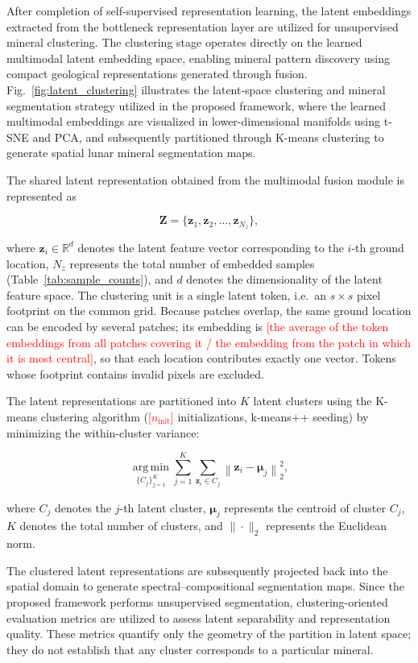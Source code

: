 \documentclass[pdflatex,sn-mathphys-num]{sn-jnl}
\newcommand{\fillin}[1]{\textcolor{red}{[#1]}}
\begin{document}
After completion of self-supervised representation learning, the latent embeddings extracted from the bottleneck representation layer are utilized for unsupervised mineral clustering. The clustering stage operates directly on the learned multimodal latent embedding space, enabling mineral pattern discovery using compact geological representations generated through fusion. Fig.~\ref{fig:latent_clustering} illustrates the latent-space clustering and mineral segmentation strategy utilized in the proposed framework, where the learned multimodal embeddings are visualized in lower-dimensional manifolds using t-SNE and PCA, and subsequently partitioned through K-means clustering to generate spatial lunar mineral segmentation maps.

The shared latent representation obtained from the multimodal fusion module is represented as

\[
\mathbf{Z}
=
\{\mathbf{z}_{1},\mathbf{z}_{2},\ldots,\mathbf{z}_{N_z}\},
\]

where $\mathbf{z}_{i}\in\mathbb{R}^{d}$ denotes the latent feature vector corresponding to the $i$-th ground location, $N_z$ represents the total number of embedded samples (Table~\ref{tab:sample_counts}), and $d$ denotes the dimensionality of the latent feature space. The clustering unit is a single latent token, i.e.\ an $s\times s$ pixel footprint on the common grid. Because patches overlap, the same ground location can be encoded by several patches; its embedding is \fillin{the average of the token embeddings from all patches covering it / the embedding from the patch in which it is most central}, so that each location contributes exactly one vector. Tokens whose footprint contains invalid pixels are excluded.

The latent representations are partitioned into $K$ latent clusters using the K-means clustering algorithm (\fillin{$n_{\mathrm{init}}$} initializations, k-means++ seeding) by minimizing the within-cluster variance:

\[
\underset{\{C_j\}_{j=1}^{K}}
{\operatorname*{arg\,min}}
\sum_{j=1}^{K}
\sum_{\mathbf{z}_{i}\in C_j}
\left\|
\mathbf{z}_{i}
-
\boldsymbol{\mu}_{j}
\right\|_{2}^{2},
\]

where $C_{j}$ denotes the $j$-th latent cluster, $\boldsymbol{\mu}_{j}$ represents the centroid of cluster $C_{j}$, $K$ denotes the total number of clusters, and $\|\cdot\|_{2}$ represents the Euclidean norm.

The clustered latent representations are subsequently projected back into the spatial domain to generate spectral--compositional segmentation maps. Since the proposed framework performs unsupervised segmentation, clustering-oriented evaluation metrics are utilized to assess latent separability and representation quality. These metrics quantify only the geometry of the partition in latent space; they do not establish that any cluster corresponds to a particular mineral.
\end{document}
